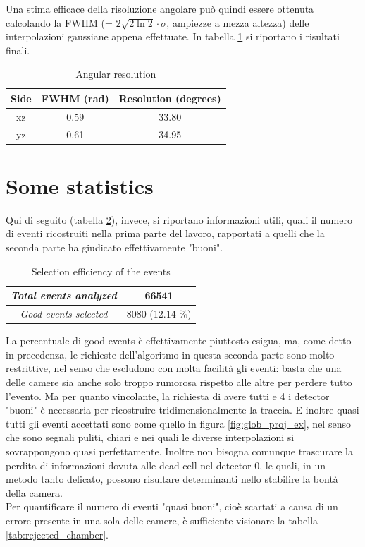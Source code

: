 \documentclass[a4paper,11pt]{book}
\begin{document}
Una stima efficace della risoluzione angolare può quindi essere ottenuta calcolando la FWHM (= $2\sqrt{2\ln 2}\cdot\sigma$, ampiezze a mezza altezza) delle interpolazioni gaussiane appena effettuate. In tabella \ref{tab:angular_resolution} si riportano i risultati finali.\\

\begin{table}[hbtp]
\centering
\begin{tabular}{c c c}
\toprule
\textbf{Side} & \textbf{FWHM (rad)} & \textbf{Resolution (degrees)}\\
\midrule
xz & 0.59 & 33.80\\
yz & 0.61 & 34.95\\
\bottomrule
\end{tabular}
\caption{Angular resolution}
\label{tab:angular_resolution}
\end{table}

\section{Some statistics}

Qui di seguito (tabella \ref{tab:stats}), invece, si riportano informazioni utili, quali il numero di eventi ricostruiti nella prima parte del lavoro, rapportati a quelli che la seconda parte ha giudicato effettivamente "buoni".\\

\begin{table}[htbp]
\centering
\begin{tabular}{c|c}
\toprule
\textit{Total events analyzed} & 66541\\
\midrule
\textit{Good events selected} & 8080 (12.14 \%)\\
\bottomrule
\end{tabular}
\caption{Selection efficiency of the events}
\label{tab:stats}
\end{table}

La percentuale di good events è effettivamente piuttosto esigua, ma, come detto in precedenza, le richieste dell'algoritmo in questa seconda parte sono molto restrittive, nel senso che escludono con molta facilità gli eventi: basta che una delle camere sia anche solo troppo rumorosa rispetto alle altre per perdere tutto l'evento. Ma per quanto vincolante, la richiesta di avere tutti e 4 i detector "buoni" è necessaria per ricostruire tridimensionalmente la traccia. E inoltre quasi tutti gli eventi accettati sono come quello in figura \ref{fig:glob_proj_ex}, nel senso che sono segnali puliti, chiari e nei quali le diverse interpolazioni si sovrappongono quasi perfettamente. Inoltre non bisogna comunque trascurare la perdita di informazioni dovuta alle dead cell nel detector 0, le quali, in un metodo tanto delicato, possono risultare determinanti nello stabilire la bontà della camera.\\
Per quantificare il numero di eventi "quasi buoni", cioè scartati a causa di un errore presente in una sola delle camere, è sufficiente visionare la tabella \ref{tab:rejected_chamber}.\\
\end{document}

